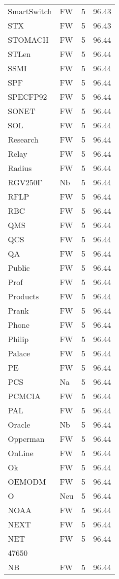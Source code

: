 \documentclass[twocolumn]{book}
\begin{document}
\begin{supertabular}{llrr}
SmartSwitch & FW & 5 &  96.43\\
STX & FW & 5 &  96.43\\
STOMACH & FW & 5 &  96.44\\
STLen & FW & 5 &  96.44\\
SSMI & FW & 5 &  96.44\\
SPF & FW & 5 &  96.44\\
SPECFP92 & FW & 5 &  96.44\\
SONET & FW & 5 &  96.44\\
SOL & FW & 5 &  96.44\\
Research & FW & 5 &  96.44\\
Relay & FW & 5 &  96.44\\
Radius & FW & 5 &  96.44\\
RGV250Γ & Nb & 5 &  96.44\\
RFLP & FW & 5 &  96.44\\
RBC & FW & 5 &  96.44\\
QMS & FW & 5 &  96.44\\
QCS & FW & 5 &  96.44\\
QA & FW & 5 &  96.44\\
Public & FW & 5 &  96.44\\
Prof & FW & 5 &  96.44\\
Products & FW & 5 &  96.44\\
Prank & FW & 5 &  96.44\\
Phone & FW & 5 &  96.44\\
Philip & FW & 5 &  96.44\\
Palace & FW & 5 &  96.44\\
PE & FW & 5 &  96.44\\
PCS & Na & 5 &  96.44\\
PCMCIA & FW & 5 &  96.44\\
PAL & FW & 5 &  96.44\\
Oracle & Nb & 5 &  96.44\\
Opperman & FW & 5 &  96.44\\
OnLine & FW & 5 &  96.44\\
Ok & FW & 5 &  96.44\\
OEMODM & FW & 5 &  96.44\\
O & Neu & 5 &  96.44\\
NOAA & FW & 5 &  96.44\\
NEXT & FW & 5 &  96.44\\
NET & FW & 5 &  96.44\\
47650\\
NB & FW & 5 &  96.44\\

\end{supertabular}
\end{document}
